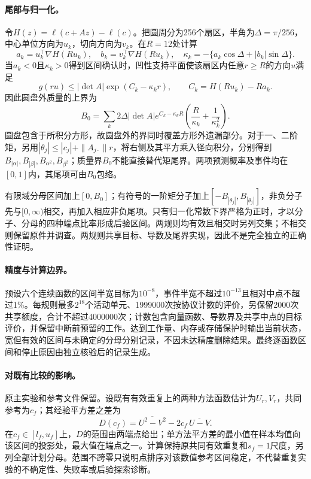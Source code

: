 \paragraph{尾部与归一化。}
令$H(z)=\ell(c+Az)-\ell(c)$。把圆周分为256个扇区，半角为$\Delta=\pi/256$，中心单位方向为$u_k$，切向方向为$v_k$。在$R=12$处计算
\[
a_k=u_k^\top\nabla H(Ru_k),\quad
b_k=v_k^\top\nabla H(Ru_k),\quad
\kappa_k=-\{a_k\cos\Delta+|b_k|\sin\Delta\}.
\]
当$a_k<0$且$\kappa_k>0$得到区间确认时，凹性支持平面使该扇区内任意$r\geq R$的方向$u$满足
\[
g(ru)\leq |\det A|\exp(C_k-\kappa_k r),\qquad
C_k=H(Ru_k)-Ra_k.
\]
因此圆盘外质量的上界为
\begin{equation}
B_0=\sum_k2\Delta|\det A|e^{C_k-\kappa_k R}
\left(\frac{R}{\kappa_k}+\frac{1}{\kappa_k^2}\right).
\label{eq:w1-tail-bound}
\end{equation}
圆盘包含于所积分方形，故圆盘外的界同时覆盖方形外遗漏部分。对于一、二阶矩，另用$|\theta_j|\leq |c_j|+\|A_{j\cdot}\|r$，将右侧及其平方乘入径向积分，分别得到$B_{|\alpha|},B_{|\beta|},B_{\alpha^2},B_{\beta^2}$；质量界$B_0$不能直接替代矩尾界。两项预测概率及事件均在$[0,1]$内，其尾项可由$B_0$包络。

有限域分母区间加上$[0,B_0]$；有符号的一阶矩分子加上$[-B_{|\theta_j|},B_{|\theta_j|}]$，非负分子先与$[0,\infty)$相交，再加入相应非负尾项。只有归一化常数下界严格为正时，才以分子、分母的四种端点比率形成后验区间。两规则均有效且相交时另列交集；不相交则保留原件并调查。两规则共享目标、导数及尾界实现，因此不是完全独立的正确性证明。

\paragraph{精度与计算边界。}
预设六个连续函数的区间半宽目标为$10^{-8}$，事件半宽不超过$10^{-13}$且相对中点不超过1\%。每规则最多$2^{18}$个活动单元、1999000次按协议计数的评价，另保留2000次共享额度，合计不超过4000000次；计数包含向量函数、导数界及共享中点的目标评价，并保留中断前预留的工作。达到工作量、内存或存储保护时输出当前状态，宽但有效的区间与未确定的分母分别记录，不因未达精度删除结果。最终逐函数区间和停止原因由独立核验后的记录生成。

\paragraph{对既有比较的影响。}
原主实验和参考文件保留。设既有有效重复上的两种方法函数估计为$U_r,V_r$，共同参考为$c_f$；其经验平方差之差为
\[
D(c_f)=\overline{U^2-V^2}-2c_f\,\overline{U-V}.
\]
在$c_f\in[l_f,u_f]$上，$D$的范围由两端点给出；单方法平方差的最小值在样本均值向该区间的投影处，最大值在端点之一。计算保持原共同有效重复和$s_f=1$尺度，另列全部计划分母。范围不跨零只说明点排序对该数值参考区间稳定，不代替重复实验的不确定性、失败率或后验探索诊断。
